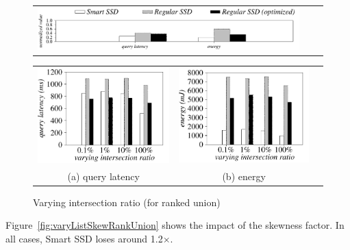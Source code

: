 \begin{figure}[tbp]
\centering
\begin{tabular}{ccc}
\includegraphics[width=0.95\columnwidth]{figures/banner.pdf}
\end{tabular}
\renewcommand{\tabcolsep}{0.1mm}
\begin{tabular}{ccc}
\includegraphics[width=0.5\columnwidth]{figures/RankUnion-time-VaryInterRatio-eps-converted-to.pdf}&
\includegraphics[width=0.5\columnwidth]{figures/RankUnion-energy-VaryInterRatio-eps-converted-to.pdf}\\
(a) query latency & (b) energy
\end{tabular}
\caption{Varying intersection ratio (for ranked union)}
\label{fig:varyInterRatioRankUnion}
\end{figure}


Figure~\ref{fig:varyListSkewRankUnion} shows the impact of the skewness factor. In all cases, Smart SSD loses around 1.2$\times$.

